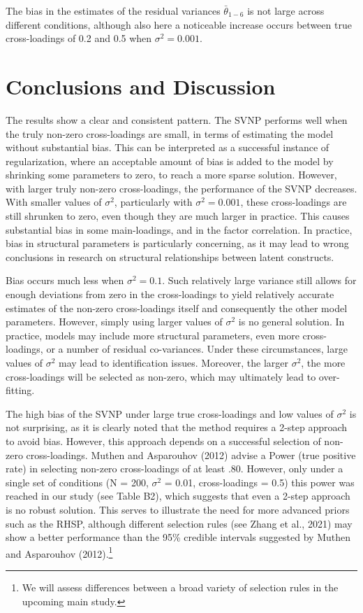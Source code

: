 \documentclass[
  man,floatsintext]{apa6}
\begin{document}
The bias in the estimates of the residual variances \(\bar{\theta}_{1-6}\) is not large across different conditions, although also here a noticeable increase occurs between true cross-loadings of 0.2 and 0.5 when \(\sigma^2 = 0.001\).

\hypertarget{conclusions-and-discussion}{%
\section{Conclusions and Discussion}\label{conclusions-and-discussion}}

The results show a clear and consistent pattern. The SVNP performs well when the truly non-zero cross-loadings are small, in terms of estimating the model without substantial bias. This can be interpreted as a successful instance of regularization, where an acceptable amount of bias is added to the model by shrinking some parameters to zero, to reach a more sparse solution. However, with larger truly non-zero cross-loadings, the performance of the SVNP decreases. With smaller values of \(\sigma^2\), particularly with \(\sigma^2 = 0.001\), these cross-loadings are still shrunken to zero, even though they are much larger in practice. This causes substantial bias in some main-loadings, and in the factor correlation. In practice, bias in structural parameters is particularly concerning, as it may lead to wrong conclusions in research on structural relationships between latent constructs.

Bias occurs much less when \(\sigma^2 = 0.1\). Such relatively large variance still allows for enough deviations from zero in the cross-loadings to yield relatively accurate estimates of the non-zero cross-loadings itself and consequently the other model parameters. However, simply using larger values of \(\sigma^2\) is no general solution. In practice, models may include more structural parameters, even more cross-loadings, or a number of residual co-variances. Under these circumstances, large values of \(\sigma^2\) may lead to identification issues. Moreover, the larger \(\sigma^2\), the more cross-loadings will be selected as non-zero, which may ultimately lead to over-fitting.

The high bias of the SVNP under large true cross-loadings and low values of \(\sigma^2\) is not surprising, as it is clearly noted that the method requires a 2-step approach to avoid bias. However, this approach depends on a successful selection of non-zero cross-loadings. Muthen and Asparouhov (2012) advise a Power (true positive rate) in selecting non-zero cross-loadings of at least .80. However, only under a single set of conditions (N = 200, \(\sigma^2\) = 0.01, cross-loadings = 0.5) this power was reached in our study (see Table B2), which suggests that even a 2-step approach is no robust solution. This serves to illustrate the need for more advanced priors such as the RHSP, although different selection rules (see Zhang et al., 2021) may show a better performance than the 95\% credible intervals suggested by Muthen and Asparouhov (2012).\footnote{We will assess differences between a broad variety of selection rules in the upcoming main study.}
\end{document}
